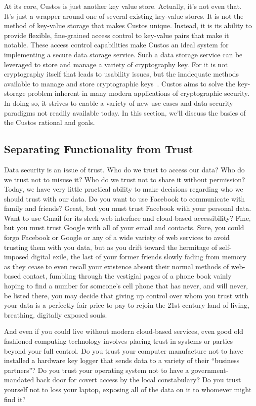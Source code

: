 At its core, Custos is just another key value store. Actually, it's
not even that. It's just a wrapper around one of several existing
key-value stores. It is not the method of key-value storage that makes
Custos unique. Instead, it is its ability to provide flexible,
fine-grained access control to key-value pairs that make it
notable. These access control capabilities make Custos an ideal system
for implementing a secure data storage service. Such a data storage
service can be leveraged to store and manage a variety of cryptography
key. For it is not cryptography itself that leads to usability issues,
but the inadequate methods available to manage and store cryptographic
keys~\cite{Kher2005}. Custos aims to solve the key-storage problem
inherent in many modern applications of cryptographic security. In
doing so, it strives to enable a variety of new use cases and data
security paradigms not readily available today. In this section, we'll
discuss the basics of the Custos rational and goals.

\subsection{Separating Functionality from Trust}

Data security is an issue of trust. Who do we trust to access our
data? Who do we trust not to misuse it? Who do we trust not to share
it without permission? Today, we have very little practical ability to
make decisions regarding who we should trust with our data. Do you
want to use Facebook to communicate with family and friends? Great,
but you must trust Facebook with your personal data. Want to use Gmail
for its sleek web interface and cloud-based accessibility? Fine, but
you must trust Google with all of your email and contacts. Sure, you
could forgo Facebook or Google or any of a wide variety of web
services to avoid trusting them with you data, but as you drift toward
the hermitage of self-imposed digital exile, the last of your former
friends slowly fading from memory as they cease to even recall your
existence absent their normal methods of web-based contact, fumbling
through the vestigial pages of a phone book vainly hoping to find a
number for someone's cell phone that has never, and will never, be
listed there, you may decide that giving up control over whom you
trust with your data is a perfectly fair price to pay to rejoin the
21st century land of living, breathing, digitally exposed souls.

And even if you could live without modern cloud-based services, even
good old fashioned computing technology involves placing trust in
systems or parties beyond your full control. Do you trust your
computer manufacture not to have installed a hardware key logger that
sends data to a variety of their ``business partners''? Do you trust
your operating system not to have a government-mandated back door for
covert access by the local constabulary?  Do you trust yourself not to
loss your laptop, exposing all of the data on it to whomever might
find it?

